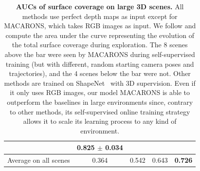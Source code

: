 \begin{table}
{{\begin{tabular}{@{}lcccc@{}}
    & \textbf{0.825} $\pm$ 0.034 \\
    \midrule
    Average on all scenes 
    & 0.364 
    & 0.542 
    & 0.643 
    & \textbf{0.726} \\
    \bottomrule
  \end{tabular}
  }}
  \caption{{\bf AUCs of surface coverage on large 3D scenes.} All methods use perfect depth maps as input except for MACARONS, which takes RGB images as input. We follow \cite{guedon-nips22-scone-surface-coverage} and compute the area under the curve representing the evolution of the total surface coverage during exploration. The 8 scenes above the bar were seen by MACARONS during self-supervised training (but with different, random starting camera poses and trajectories), and the 4 scenes below the bar were not. Other methods are trained on ShapeNet~\cite{chang-15-shapenet} with 3D supervision. Even if it only uses RGB images, our model MACARONS is able to outperform the baselines in large environments since, contrary to other methods, its self-supervised online training strategy allows it to scale its learning process to any kind of environment.}
  \label{tab:coverage_auc}
\end{table}

